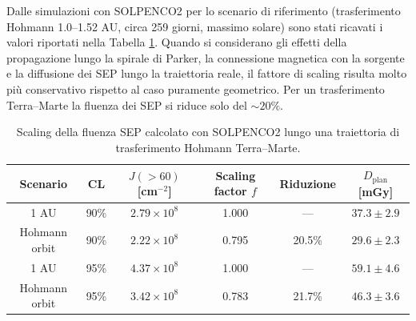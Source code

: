 \documentclass[12pt]{report}
\begin{document}
\noindent Dalle simulazioni con SOLPENCO2 per lo scenario di riferimento (trasferimento Hohmann 1.0--1.52 AU, circa 259 giorni, massimo solare) sono stati ricavati i valori riportati nella Tabella \ref{tab:solpenco_scaling}. Quando si considerano gli effetti della propagazione lungo la spirale di Parker, la connessione magnetica con la sorgente e la diffusione dei SEP lungo la traiettoria reale, il fattore di scaling risulta molto più conservativo rispetto al caso puramente geometrico. Per un trasferimento Terra--Marte la fluenza dei SEP si riduce solo del $\sim20\%$. 
\begin{table}[h]
\centering
\footnotesize
\begin{tabular}{c c c c c c}
\hline\hline
Scenario & CL & $J(>60)$ [cm$^{-2}$] & Scaling factor $f$ & Riduzione & $D_{\mathrm{plan}}$ [mGy] \\
\hline

1 AU  & 90\% & $2.79\times10^{8}$ & 1.000 & --- & $37.3\pm2.9$ \\
Hohmann orbit & 90\% & $2.22\times10^{8}$ & 0.795 & 20.5\% & $29.6\pm2.3$ \\

\hline

1 AU  & 95\% & $4.37\times10^{8}$ & 1.000 & --- & $59.1\pm4.6$ \\
Hohmann orbit & 95\% & $3.42\times10^{8}$ & 0.783 & 21.7\% & $46.3\pm3.6$ \\

\hline\hline
\end{tabular}

\caption{Scaling della fluenza SEP calcolato con SOLPENCO2 lungo una traiettoria
di trasferimento Hohmann Terra--Marte.}
\label{tab:solpenco_scaling}
\end{table}
\vspace{-25pt}
\end{document}
